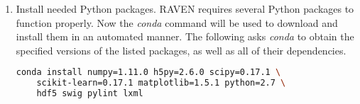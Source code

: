 \begin{enumerate}
\begin{lstlisting}[language=bash, basicstyle=\tiny]
\end{lstlisting}

	\item Install needed Python packages.  RAVEN requires several Python packages to function properly. 
		Now the {\it conda} command will be used to download and install them in an automated manner. The 
		following asks {\it conda} to obtain the specified versions of the listed packages, as well as all 
		of their dependencies.
		\smallskip

\begin{lstlisting}[language=bash]
conda install numpy=1.11.0 h5py=2.6.0 scipy=0.17.1 \
	scikit-learn=0.17.1 matplotlib=1.5.1 python=2.7 \
	hdf5 swig pylint lxml
\end{lstlisting}

\end{enumerate}

